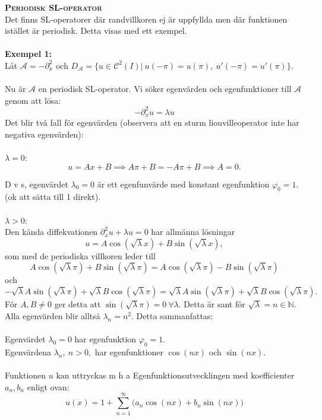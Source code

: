 \documentclass{article}
\begin{document}
\textbf{\textsc{Periodisk SL-operator}}\\
Det finns SL-operatorer där randvillkoren ej är uppfyllda men där funktionen istället är periodisk. Detta visas med ett exempel.\\ \\
\textbf{Exempel 1:}\\
Låt $\mathcal{A}=-\partial_x^2$ och $D_{\mathcal{A}}=\{u\in\mathcal{C}^2(I)| \ u(-\pi)=u(\pi), \ u'(-\pi)=u'(\pi)\}.$\\ \\
Nu är $\mathcal{A}$ en periodisk SL-operator. Vi söker egenvärden och egenfunktioner till $\mathcal{A}$ genom att lösa:
$$
-\partial_x^2u=\lambda u
$$
Det blir två fall för egenvärden (observera att en sturm liouvilleoperator inte har negativa egenvärden):\\ \\
$\lambda=0$:
\begin{equation}
    u=Ax+B \implies A\pi+B=-A\pi+B \implies A=0.
\end{equation}

D v s, egenvärdet $\lambda_0=0$ är ett egenfunvärde med konstant egenfunktion $\varphi_0=1$. (ok att sätta till 1 direkt).\\ \\
$\lambda>0$:\\
Den kända diffekvationen $\partial_x^2u+\lambda u=0$ har allmänna lösningar
$$
u=A\cos(\sqrt{\lambda}x)+B\sin(\sqrt{\lambda}x),
$$
som med de periodiska villkoren leder till
$$
A\cos(\sqrt{\lambda}\pi)+B\sin(\sqrt{\lambda}\pi)=
A\cos(\sqrt{\lambda}\pi)-B\sin(\sqrt{\lambda}\pi)
$$
och
$$
-\sqrt{\lambda}A\sin(\sqrt{\lambda}\pi)+\sqrt{\lambda}B\cos(\sqrt{\lambda}\pi)=
\sqrt{\lambda}A\sin(\sqrt{\lambda}\pi)+\sqrt{\lambda}B\cos(\sqrt{\lambda}\pi).
$$
För $A,B\neq 0$ ger detta att $\sin(\sqrt{\lambda}\pi)=0 \ \forall \lambda$. Detta är sant för $\sqrt{\lambda}=n\in\mathbb{N}$. Alla egenvärden blir alltså $\lambda_n=n^2$. Detta sammanfattas: \\ \\
Egenvärdet $\lambda_0=0$ har egenfunktion $\varphi_0=1$.\\
Egenvärdena $\lambda_n, \ n>0,$ har egenfunktioner $\cos(nx)$ och $\sin(nx)$. \\ \\
Funktionen $u$ kan uttryckas m h a Egenfunktionsutvecklingen med koefficienter $a_n,b_n$ enligt ovan:
$$
u(x)=1+\sum_{n=1}^{\infty}\big(a_n\cos(nx)+b_n\sin(nx)\big)
$$
\end{document}
